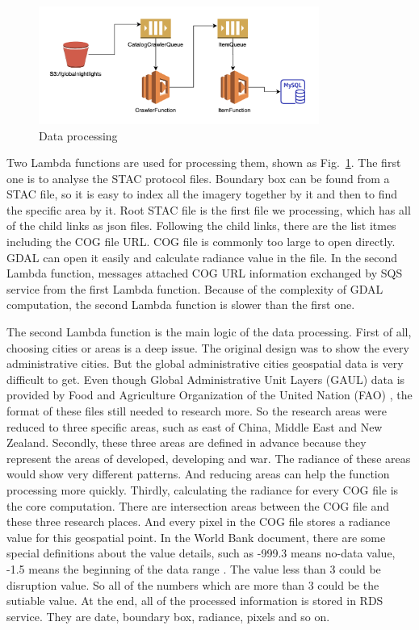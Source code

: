 \documentclass[conference]{IEEEtran}
\begin{document}
\begin{figure}[htbp]
    \centerline{\includegraphics[width=260pt]{images/dataprocess.png}}
    \caption{Data processing}
    \label{fig4}
\end{figure}

Two Lambda functions are used for processing them, shown as Fig.~\ref{fig4}. The first one is to analyse the STAC protocol files. Boundary box can be found from a STAC file, so it is easy to index
all the imagery together by it and then to find the specific area by it. Root STAC file is the first file we processing, which has all of the child links as json files. 
Following the child links, there are the list itmes including the COG file URL. COG file is commonly too large to open directly. GDAL can open it easily and calculate radiance 
value in the file. In the second Lambda function, messages attached COG URL information exchanged by SQS service from the first Lambda function. Because of the complexity 
of GDAL computation, the second Lambda function is slower than the first one.

The second Lambda function is the main logic of the data processing. First of all, choosing cities or areas is a deep issue. The original design was to show the every administrative 
cities. But the global administrative cities geospatial data is very difficult to get. Even though Global Administrative Unit Layers (GAUL) data is provided by Food and 
Agriculture Organization of the United Nation (FAO) \cite{GlobalAd98:online}, the format of these files still needed to research more. So the research areas were reduced 
to three specific areas, such as east of China, Middle East and New Zealand. Secondly, these three areas are defined in advance because they represent the areas of developed, 
developing and war. The radiance of these areas would show very different patterns. And reducing areas can help the function processing more quickly. Thirdly, calculating the 
radiance for every COG file is the core computation. There are intersection areas between the COG file and these three research places. And every pixel in the COG file stores 
a radiance value for this geospatial point. In the World Bank document, there are some special definitions about the value details, such as -999.3 means no-data value, -1.5 
means the beginning of the data range \cite{WorldBan13:online}. The value less than 3 could be disruption value. So all of the numbers which are more than 3 could be the 
sutiable value. At the end, all of the processed information is stored in RDS service. They are date, boundary box, radiance, pixels and so on.
\end{document}
